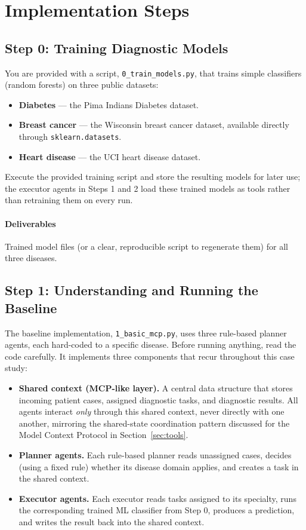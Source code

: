 \section{Implementation Steps}
\label{sec:case3-implementation}

\subsection{Step 0: Training Diagnostic Models}

You are provided with a script, \texttt{0\_train\_models.py}, that trains simple classifiers (random forests) on three public datasets:

\begin{itemize}
    \item \textbf{Diabetes} --- the Pima Indians Diabetes dataset.
    \item \textbf{Breast cancer} --- the Wisconsin breast cancer dataset, available directly through \texttt{sklearn.datasets}.
    \item \textbf{Heart disease} --- the UCI heart disease dataset.
\end{itemize}
%
Execute the provided training script and store the resulting models for later use; the executor agents in Steps 1 and 2 load these trained models as tools rather than retraining them on every run.

\paragraph{Deliverables} Trained model files (or a clear, reproducible script to regenerate them) for all three diseases.


\subsection{Step 1: Understanding and Running the Baseline}

The baseline implementation, \texttt{1\_basic\_mcp.py}, uses three rule-based planner agents, each hard-coded to a specific disease. Before running anything, read the code carefully. It implements three components that recur throughout this case study:

\begin{itemize}
    \item \textbf{Shared context (MCP-like layer).} A central data structure that stores incoming patient cases, assigned diagnostic tasks, and diagnostic results. All agents interact \emph{only} through this shared context, never directly with one another, mirroring the shared-state coordination pattern discussed for the Model Context Protocol in Section~\ref{sec:tools}.
    \item \textbf{Planner agents.} Each rule-based planner reads unassigned cases, decides (using a fixed rule) whether its disease domain applies, and creates a task in the shared context.
    \item \textbf{Executor agents.} Each executor reads tasks assigned to its specialty, runs the corresponding trained ML classifier from Step 0, produces a prediction, and writes the result back into the shared context.
\end{itemize}

